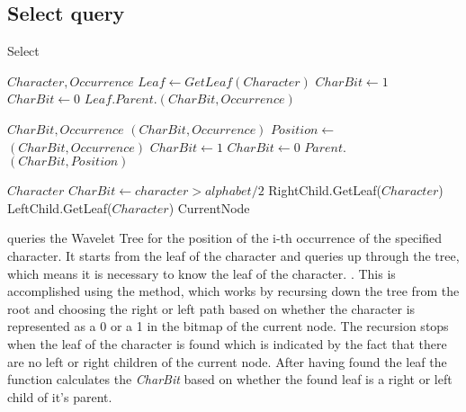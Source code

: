 \subsection{Select query}
\begin{algorithm}
\caption{Select}
\label{alg:select}
\begin{algorithmic} 
 {$Character, Occurrence$}
\State $Leaf \gets GetLeaf(Character)$
	\State $CharBit \gets 1$
\Else
	\State $CharBit \gets 0$
\EndIf
\State \Return $Leaf.Parent.$$(CharBit, Occurrence)$
\EndFunction

\vspace{1cm}

 {$CharBit, Occurrence$}
	\State \Return {}$(CharBit, Occurrence)$
\EndIf
\State $Position \gets $$(CharBit, Occurrence)$
	\State $CharBit \gets 1$
\Else
	\State $CharBit \gets 0$
\EndIf
\State \Return $Parent.$$(CharBit, Position)$
\EndFunction

\vspace{1cm}

 {$Character$}
\State $CharBit \gets character > alphabet/2$
	\State RightChild.GetLeaf($Character$)
	\State LeftChild.GetLeaf($Character$)
\EndIf
\State \Return CurrentNode
\EndFunction
\end{algorithmic}
\end{algorithm}

 queries the Wavelet Tree for the position of the i-th occurrence of the specified character.
It starts from the leaf of the character and queries up through the tree, which means it is necessary to know the leaf of the character. \citep[Section 2.2]{Claude08practicalrankselect}. 
This is accomplished using the  method, which works by recursing down the tree from the root and choosing the right or left path based on whether the character is represented as a 0 or a 1 in the bitmap of the current node.
The recursion stops when the leaf of the character is found which is indicated by the fact that there are no left or right children of the current node.
After having found the leaf the  function calculates the \textit{CharBit} based on whether the found leaf is a right or left child of it's parent.

